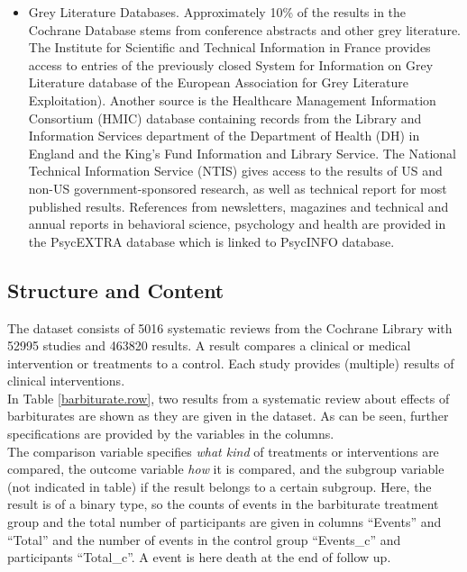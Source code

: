 \documentclass[11pt,a4paper,twoside]{book}\usepackage[]{graphicx}\usepackage[]{color}
\begin{document}
\begin{itemize}
\item Grey Literature Databases. Approximately 10\% of the results in the Cochrane Database stems from conference abstracts and other grey literature. The Institute for Scientific and Technical Information in France provides access to entries of the previously closed System for Information on Grey Literature database of the European Association for Grey Literature Exploitation). Another source is the Healthcare Management Information Consortium (HMIC) database containing records from the Library and Information Services department of the Department of Health (DH) in England and the King's Fund Information and Library Service. The National Technical Information Service (NTIS) gives access to the results of US and non-US government-sponsored research, as well as technical report for most published results. References from newsletters, magazines and technical and annual reports in behavioral science, psychology and health are provided in the PsycEXTRA database which is linked to PsycINFO database.
\end{itemize}


\subsection{Structure and Content}
The dataset consists of 5016 systematic reviews from the Cochrane Library with 52995 studies and 463820 results. A result compares a clinical or medical intervention or treatments to a control. Each study provides (multiple) results of clinical interventions. \\
In Table \ref{barbiturate.row}, two results from a systematic review about effects of barbiturates are shown as they are given in the dataset. As can be seen, further specifications are provided by the variables in the columns. \\
The comparison variable specifies \textit{what kind} of treatments or interventions are compared, the outcome variable \textit{how} it is compared, and the subgroup variable (not indicated in table) if the result belongs to a certain subgroup. Here, the result is of a binary type, so the counts of events in the barbiturate treatment group and the total number of participants are given in columns ``Events'' and ``Total'' and the number of events in the control group ``Events\_c'' and participants ``Total\_c''. A event is here death at the end of follow up.
\end{document}

